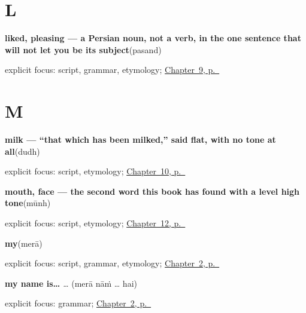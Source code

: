\section*{L}

\noindent\begin{minipage}[t]{\linewidth}
\raggedright
\textbf{liked, pleasing — a Persian noun, not a verb, in the one sentence that will not let you be its subject}\enspace\emph{}\enspace(pasand)\par
\footnotesize explicit focus: script, grammar, etymology; \hyperref[ch:pa-taking-and-liking]{Chapter~9, p.~\pageref*{ch:pa-taking-and-liking}}
\end{minipage}\par\smallskip

\section*{M}

\noindent\begin{minipage}[t]{\linewidth}
\raggedright
\textbf{milk — \textquotedblleft{}that which has been milked,\textquotedblright{} said flat, with no tone at all}\enspace\emph{}\enspace(dudh)\par
\footnotesize explicit focus: script, etymology; \hyperref[ch:pa-request-food-drink]{Chapter~10, p.~\pageref*{ch:pa-request-food-drink}}
\end{minipage}\par\smallskip

\noindent\begin{minipage}[t]{\linewidth}
\raggedright
\textbf{mouth, face — the second word this book has found with a level high tone}\enspace\emph{}\enspace(mūnh)\par
\footnotesize explicit focus: script, etymology; \hyperref[ch:pa-face-parts]{Chapter~12, p.~\pageref*{ch:pa-face-parts}}
\end{minipage}\par\smallskip

\noindent\begin{minipage}[t]{\linewidth}
\raggedright
\textbf{my}\enspace\emph{}\enspace(merā)\par
\footnotesize explicit focus: script, grammar, etymology; \hyperref[ch:introductions]{Chapter~2, p.~\pageref*{ch:introductions}}
\end{minipage}\par\smallskip

\noindent\begin{minipage}[t]{\linewidth}
\raggedright
\textbf{my name is…}\enspace\emph{  … }\enspace(merā nāṁ … hai)\par
\footnotesize explicit focus: grammar; \hyperref[ch:introductions]{Chapter~2, p.~\pageref*{ch:introductions}}
\end{minipage}\par\smallskip

